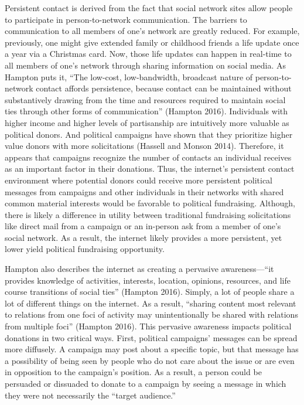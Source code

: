 \documentclass[12pt,]{article}
\begin{document}
Persistent contact is derived from the fact that social network sites
allow people to participate in person-to-network communication. The
barriers to communication to all members of one's network are greatly
reduced. For example, previously, one might give extended family or
childhood friends a life update once a year via a Christmas card. Now,
those life updates can happen in real-time to all members of one's
network through sharing information on social media. As Hampton puts it,
``The low-cost, low-bandwidth, broadcast nature of person-to-network
contact affords persistence, because contact can be maintained without
substantively drawing from the time and resources required to maintain
social ties through other forms of communication'' (Hampton 2016).
Individuals with higher income and higher levels of partisanship are
intuitively more valuable as political donors. And political campaigns
have shown that they prioritize higher value donors with more
solicitations (Hassell and Monson 2014). Therefore, it appears that
campaigns recognize the number of contacts an individual receives as an
important factor in their donations. Thus, the internet's persistent
contact environment where potential donors could receive more persistent
political messages from campaigns and other individuals in their
networks with shared common material interests would be favorable to
political fundraising. Although, there is likely a difference in utility
between traditional fundraising solicitations like direct mail from a
campaign or an in-person ask from a member of one's social network. As a
result, the internet likely provides a more persistent, yet lower yield
political fundraising opportunity.

Hampton also describes the internet as creating a pervasive
awareness---``it provides knowledge of activities, interests, location,
opinions, resources, and life course transitions of social ties''
(Hampton 2016). Simply, a lot of people share a lot of different things
on the internet. As a result, ``sharing content most relevant to
relations from one foci of activity may unintentionally be shared with
relations from multiple foci'' (Hampton 2016). This pervasive awareness
impacts political donations in two critical ways. First, political
campaigns' messages can be spread more diffusely. A campaign may post
about a specific topic, but that message has a possibility of being seen
by people who do not care about the issue or are even in opposition to
the campaign's position. As a result, a person could be persuaded or
dissuaded to donate to a campaign by seeing a message in which they were
not necessarily the ``target audience.''
\end{document}
